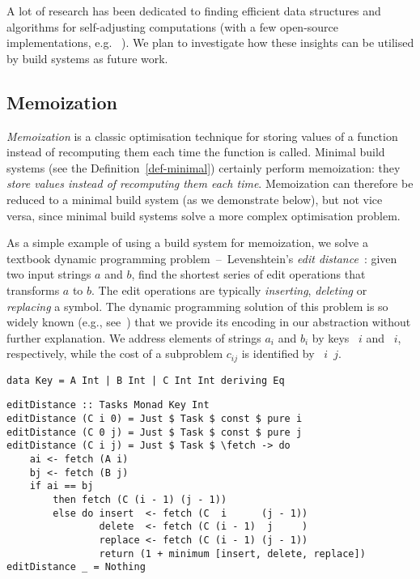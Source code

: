 A lot of research has been dedicated to finding efficient data structures and
algorithms for self-adjusting computations (with a few open-source
implementations, e.g. \Incremental~\cite{incremental}). We plan to investigate
how these insights can be utilised by build systems as future work.

\subsection{Memoization}\label{sec-related-memo}

\emph{Memoization} is a classic optimisation technique for storing values of a
function instead of recomputing them each time the function is called. Minimal
build systems (see the Definition~\ref{def-minimal}) certainly perform
memoization: they \emph{store values instead of recomputing them each time}.
Memoization can therefore be reduced to a minimal build system (as we
demonstrate below), but not vice versa, since minimal build systems solve a more
complex optimisation problem.

As a simple example of using a build system for memoization, we solve a textbook
dynamic programming problem~--~Levenshtein's \emph{edit
distance}~\cite{levenshtein1966binary}: given two input strings $a$ and
$b$, find the shortest series of edit operations that transforms $a$
to $b$. The edit operations are typically \emph{inserting}, \emph{deleting} or
\emph{replacing} a symbol. The dynamic programming solution of this problem is
so widely known (e.g., see~\cite{cormen2001introduction}) that we provide its
encoding in our  abstraction without further explanation. We address
elements of strings $a_i$ and $b_i$ by keys ~$i$ and ~$i$,
respectively, while the cost of a subproblem $c_{ij}$ is identified by
~$i$~$j$.

\vspace{0.5mm}
\begin{verbatim}
data Key = A Int | B Int | C Int Int deriving Eq
\end{verbatim}
\vspace{0mm}
\begin{verbatim}
editDistance :: Tasks Monad Key Int
editDistance (C i 0) = Just $ Task $ const $ pure i
editDistance (C 0 j) = Just $ Task $ const $ pure j
editDistance (C i j) = Just $ Task $ \fetch -> do
    ai <- fetch (A i)
    bj <- fetch (B j)
    if ai == bj
        then fetch (C (i - 1) (j - 1))
        else do insert  <- fetch (C  i      (j - 1))
                delete  <- fetch (C (i - 1)  j     )
                replace <- fetch (C (i - 1) (j - 1))
                return (1 + minimum [insert, delete, replace])
editDistance _ = Nothing
\end{verbatim}
\vspace{0.5mm}

